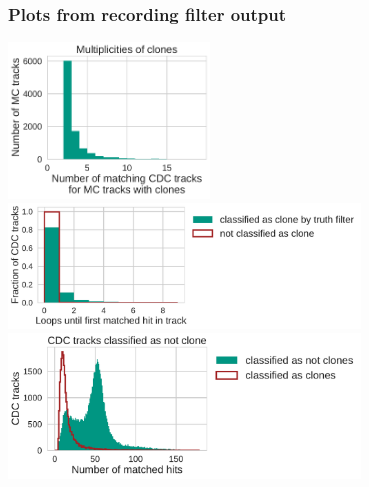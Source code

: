 \documentclass[18pt]{beamer}
\begin{document}
\begin{frame}[allowframebreaks]
  \frametitle{Plots from recording filter output}
  \includegraphics[width=0.4\textwidth]{figures/clone_multiplicities.pdf}\\
  \includegraphics[width=0.7\textwidth]{figures/loop_numbers.pdf}\\
  \includegraphics[width=0.7\textwidth]{figures/matched_hits.pdf}\\
\end{frame}
\end{document}
